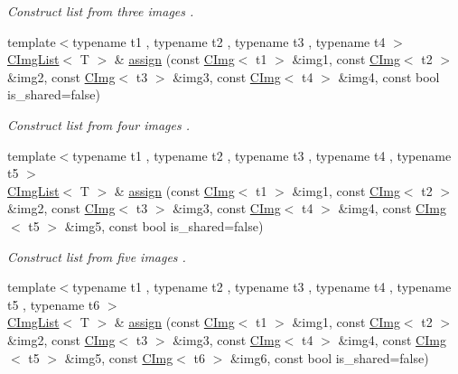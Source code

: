 \begin{DoxyCompactItemize}
\begin{DoxyCompactList}\small\item\em Construct list from three images . \end{DoxyCompactList}\item 
{\footnotesize template$<$typename t1 , typename t2 , typename t3 , typename t4 $>$ }\\\hyperlink{structcimg__library__suffixed_1_1CImgList}{C\+Img\+List}$<$ T $>$ \& \hyperlink{structcimg__library__suffixed_1_1CImgList_a1670923003551b68bb933c6420716cb3}{assign} (const \hyperlink{structcimg__library__suffixed_1_1CImg}{C\+Img}$<$ t1 $>$ \&img1, const \hyperlink{structcimg__library__suffixed_1_1CImg}{C\+Img}$<$ t2 $>$ \&img2, const \hyperlink{structcimg__library__suffixed_1_1CImg}{C\+Img}$<$ t3 $>$ \&img3, const \hyperlink{structcimg__library__suffixed_1_1CImg}{C\+Img}$<$ t4 $>$ \&img4, const bool is\+\_\+shared=false)
\begin{DoxyCompactList}\small\item\em Construct list from four images . \end{DoxyCompactList}\item 
{\footnotesize template$<$typename t1 , typename t2 , typename t3 , typename t4 , typename t5 $>$ }\\\hyperlink{structcimg__library__suffixed_1_1CImgList}{C\+Img\+List}$<$ T $>$ \& \hyperlink{structcimg__library__suffixed_1_1CImgList_a528f9e8ca3f6c499f378a911da424933}{assign} (const \hyperlink{structcimg__library__suffixed_1_1CImg}{C\+Img}$<$ t1 $>$ \&img1, const \hyperlink{structcimg__library__suffixed_1_1CImg}{C\+Img}$<$ t2 $>$ \&img2, const \hyperlink{structcimg__library__suffixed_1_1CImg}{C\+Img}$<$ t3 $>$ \&img3, const \hyperlink{structcimg__library__suffixed_1_1CImg}{C\+Img}$<$ t4 $>$ \&img4, const \hyperlink{structcimg__library__suffixed_1_1CImg}{C\+Img}$<$ t5 $>$ \&img5, const bool is\+\_\+shared=false)
\begin{DoxyCompactList}\small\item\em Construct list from five images . \end{DoxyCompactList}\item 
{\footnotesize template$<$typename t1 , typename t2 , typename t3 , typename t4 , typename t5 , typename t6 $>$ }\\\hyperlink{structcimg__library__suffixed_1_1CImgList}{C\+Img\+List}$<$ T $>$ \& \hyperlink{structcimg__library__suffixed_1_1CImgList_a0e075a83b7c2e0af55772642d679c921}{assign} (const \hyperlink{structcimg__library__suffixed_1_1CImg}{C\+Img}$<$ t1 $>$ \&img1, const \hyperlink{structcimg__library__suffixed_1_1CImg}{C\+Img}$<$ t2 $>$ \&img2, const \hyperlink{structcimg__library__suffixed_1_1CImg}{C\+Img}$<$ t3 $>$ \&img3, const \hyperlink{structcimg__library__suffixed_1_1CImg}{C\+Img}$<$ t4 $>$ \&img4, const \hyperlink{structcimg__library__suffixed_1_1CImg}{C\+Img}$<$ t5 $>$ \&img5, const \hyperlink{structcimg__library__suffixed_1_1CImg}{C\+Img}$<$ t6 $>$ \&img6, const bool is\+\_\+shared=false)

\end{DoxyCompactItemize}
